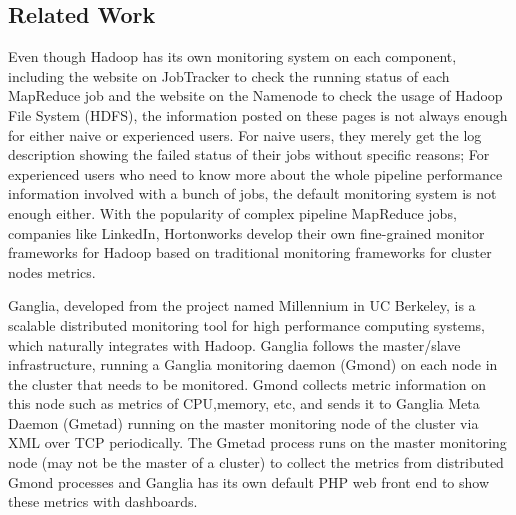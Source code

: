 \subsection{Related Work}
Even though Hadoop has its own monitoring system on each component, including the website on JobTracker to check the running status of each MapReduce job and the website on the Namenode to check the usage of Hadoop File System (HDFS), the information posted on these pages is not always enough for either naive or experienced users.
For naive users, they merely get the log description showing the failed status of their jobs without specific reasons; For experienced users who need to know more about the whole pipeline performance information involved with a bunch of jobs, the default monitoring system is not enough either.
With the popularity of complex pipeline MapReduce jobs, companies like LinkedIn, Hortonworks develop their own fine-grained monitor frameworks for Hadoop based on traditional monitoring frameworks for cluster nodes metrics.\par
Ganglia\cite{massie2004ganglia}, developed from the project named Millennium in UC Berkeley, is a scalable distributed monitoring tool for high performance computing systems, which naturally integrates with Hadoop.
Ganglia follows the master/slave infrastructure, running a Ganglia monitoring daemon (Gmond) on each node in the cluster that needs to be monitored.
Gmond collects metric information on this node such as metrics of CPU,memory, etc, and sends it to Ganglia Meta Daemon (Gmetad) running on the master monitoring node of the cluster via XML over TCP periodically.
The Gmetad process runs on the master monitoring node (may not be the master of a cluster) to collect the metrics from distributed Gmond processes and Ganglia has its own default PHP web front end to show these metrics with dashboards.


